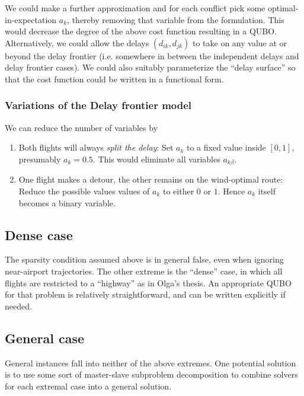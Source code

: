 \documentclass{article}
\begin{document}
We could make a further approximation and for each conflict pick some optimal-in-expectation $a_k$, thereby removing that variable from the formulation.
This would decrease the degree of the above cost function resulting in a QUBO.
Alternatively, we could allow the delays $(d_{ik}, d_{jk})$ to take on any value at or beyond the delay frontier (i.e. somewhere in between the independent delays and delay frontier cases).
We could also suitably parameterize the ``delay surface'' so that the cost function could be written in a functional form.

\subsubsection{Variations of the Delay frontier model}
We can reduce the number of variables by
\begin{enumerate}
    \item Both flights will always \textit{split the delay}: Set $a_k$ to a fixed value inside $[0, 1]$, presumably $a_k = 0.5$. This would eliminate all variables $a_{k\beta}$.
    \item One flight makes a detour, the other remains on the wind-optimal route: Reduce the possible values values of $a_k$ to either $0$ or $1$. Hence $a_k$ itself becomes a binary variable.
\end{enumerate}

\subsection{Dense case}
The sparsity condition assumed above is in general false, even when ignoring near-airport trajectories.
The other extreme is the ``dense'' case, in which all flights are restricted to a ``highway'' as in Olga's thesis.
An appropriate QUBO for that problem is relatively straightforward, and can be written explicitly if needed.

\subsection{General case}
General instances fall into neither of the above extremes.
One potential solution is to use some sort of master-slave subproblem decomposition to combine solvers for each extremal case into a general solution.
\end{document}
